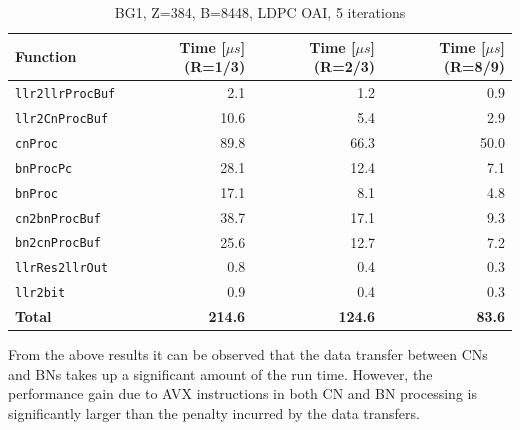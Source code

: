 \documentclass{article}
\begin{document}
\begin{table}[ht]
  \centering
  \begin{tabular}{lrrr}
    \toprule
    \textbf{Function} &  \textbf{Time [$\mu s$] (R=1/3)} & \textbf{Time [$\mu s$] (R=2/3)} & \textbf{Time [$\mu s$] (R=8/9)}\\
    \midrule
    \texttt{llr2llrProcBuf}  & 2.1  & 1.2  & 0.9  \\
    \texttt{llr2CnProcBuf}   & 10.6 & 5.4  & 2.9  \\
    \texttt{cnProc}          & 89.8 & 66.3 & 50.0 \\
    \texttt{bnProcPc}        & 28.1 & 12.4 & 7.1 \\
    \texttt{bnProc}          & 17.1 & 8.1  & 4.8 \\
    \texttt{cn2bnProcBuf}    & 38.7 & 17.1 & 9.3 \\
    \texttt{bn2cnProcBuf}    & 25.6 & 12.7 & 7.2 \\
    \texttt{llrRes2llrOut}   & 0.8  & 0.4  & 0.3 \\
    \texttt{llr2bit}         & 0.9  & 0.4  & 0.3 \\
    \midrule
    \textbf{Total}           & \textbf{214.6} & \textbf{124.6} & \textbf{83.6}\\
    \bottomrule
  \end{tabular}
  \caption{BG1, Z=384, B=8448, LDPC OAI, 5 iterations}
  \label{tab:lat-bg1-i5}
\end{table}

From the above results it can be observed that the data transfer between CNs and BNs takes up a significant amount of the run time. However, the performance gain due to AVX instructions in both CN and BN processing is significantly larger than the penalty incurred by the data transfers.
\end{document}
